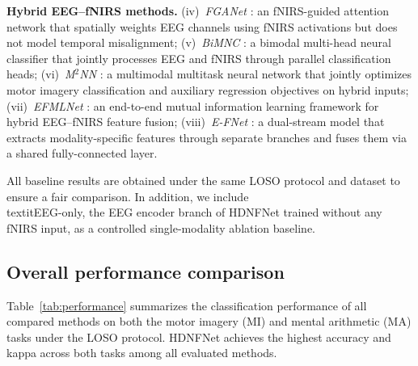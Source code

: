 \documentclass[preprint,12pt,authoryear]{elsarticle}
\begin{document}
\noindent\textbf{Hybrid EEG--fNIRS methods.} (iv)~\textit{FGANet} \citep{kwak2022fganet}: an fNIRS-guided attention network that spatially weights EEG channels using fNIRS activations but does not model temporal misalignment; (v)~\textit{BiMNC} \citep{xu2024bimnc}: a bimodal multi-head neural classifier that jointly processes EEG and fNIRS through parallel classification heads; (vi)~\textit{M$^2$NN} \citep{he2022multimodal_mtnn}: a multimodal multitask neural network that jointly optimizes motor imagery classification and auxiliary regression objectives on hybrid inputs; (vii)~\textit{EFMLNet} \citep{qiu2024efmlnet}: an end-to-end mutual information learning framework for hybrid EEG--fNIRS feature fusion; (viii)~\textit{E-FNet} \citep{yu2025efnet}: a dual-stream model that extracts modality-specific features through separate branches and fuses them via a shared fully-connected layer.

All baseline results are obtained under the same LOSO protocol and dataset to ensure a fair comparison. In addition, we include \\textit{EEG-only}, the EEG encoder branch of HDNFNet trained without any fNIRS input, as a controlled single-modality ablation baseline.


\subsection{Overall performance comparison}
\label{sec:performance}

Table~\ref{tab:performance} summarizes the classification performance of all compared methods on both the motor imagery (MI) and mental arithmetic (MA) tasks under the LOSO protocol. HDNFNet achieves the highest accuracy and kappa across both tasks among all evaluated methods.
\end{document}
